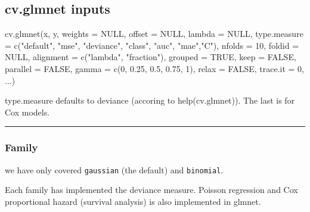 \documentclass[
  letterpaper,
  DIV=11,
  numbers=noendperiod]{scrartcl}
\newenvironment{Shaded}{\begin{snugshade}}{\end{snugshade}}
\newcommand{\AttributeTok}[1]{\textcolor[rgb]{0.40,0.45,0.13}{#1}}
\newcommand{\ConstantTok}[1]{\textcolor[rgb]{0.56,0.35,0.01}{#1}}
\newcommand{\DecValTok}[1]{\textcolor[rgb]{0.68,0.00,0.00}{#1}}
\newcommand{\FloatTok}[1]{\textcolor[rgb]{0.68,0.00,0.00}{#1}}
\newcommand{\FunctionTok}[1]{\textcolor[rgb]{0.28,0.35,0.67}{#1}}
\newcommand{\NormalTok}[1]{\textcolor[rgb]{0.00,0.23,0.31}{#1}}
\newcommand{\StringTok}[1]{\textcolor[rgb]{0.13,0.47,0.30}{#1}}
\begin{document}
\hypertarget{cv.glmnet-inputs}{%
\subsection{cv.glmnet inputs}\label{cv.glmnet-inputs}}

\begin{Shaded}
\begin{Highlighting}[]
\FunctionTok{cv.glmnet}\NormalTok{(x, y, }\AttributeTok{weights =} \ConstantTok{NULL}\NormalTok{, }\AttributeTok{offset =} \ConstantTok{NULL}\NormalTok{, }\AttributeTok{lambda =} \ConstantTok{NULL}\NormalTok{,}
  \AttributeTok{type.measure =} \FunctionTok{c}\NormalTok{(}\StringTok{"default"}\NormalTok{, }\StringTok{"mse"}\NormalTok{, }\StringTok{"deviance"}\NormalTok{, }\StringTok{"class"}\NormalTok{, }\StringTok{"auc"}\NormalTok{, }\StringTok{"mae"}\NormalTok{,}\StringTok{"C"}\NormalTok{),}
  \AttributeTok{nfolds =} \DecValTok{10}\NormalTok{, }\AttributeTok{foldid =} \ConstantTok{NULL}\NormalTok{, }
  \AttributeTok{alignment =} \FunctionTok{c}\NormalTok{(}\StringTok{"lambda"}\NormalTok{, }\StringTok{"fraction"}\NormalTok{), }\AttributeTok{grouped =} \ConstantTok{TRUE}\NormalTok{, }
  \AttributeTok{keep =} \ConstantTok{FALSE}\NormalTok{, }\AttributeTok{parallel =} \ConstantTok{FALSE}\NormalTok{,}
  \AttributeTok{gamma =} \FunctionTok{c}\NormalTok{(}\DecValTok{0}\NormalTok{, }\FloatTok{0.25}\NormalTok{, }\FloatTok{0.5}\NormalTok{, }\FloatTok{0.75}\NormalTok{, }\DecValTok{1}\NormalTok{), }\AttributeTok{relax =} \ConstantTok{FALSE}\NormalTok{, }\AttributeTok{trace.it =} \DecValTok{0}\NormalTok{, ...)}
\end{Highlighting}
\end{Shaded}

type.measure defaults to deviance (accoring to help(cv.glmnet)). The
last is for Cox models.

\begin{center}\rule{0.5\linewidth}{0.5pt}\end{center}

\hypertarget{family}{%
\subsubsection{Family}\label{family}}

we have only covered \texttt{gaussian} (the default) and
\texttt{binomial}.

Each family has implemented the deviance measure. Poisson regression and
Cox proportional hazard (survival analysis) is also implemented in
glmnet.
\end{document}
